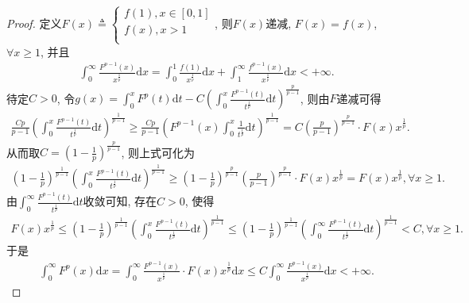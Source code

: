 \documentclass[../../main.tex]{subfiles}%
\begin{document}
\begin{proof}

定义$F\left( x \right) \triangleq \begin{cases}
f\left( 1 \right) ,x\in \left[ 0,1 \right]\\
f\left( x \right) ,x>1\\
\end{cases}$, 则$F\left( x \right) $递减, $F\left( x \right) =f\left( x \right) $, $\forall x\geqslant 1$, 并且
\begin{align*}
\int_0^{\infty}{\frac{F^{p-1}\left( x \right)}{x^{\frac{1}{p}}}\mathrm{d}x}=\int_0^1{\frac{f\left( 1 \right)}{x^{\frac{1}{p}}}\mathrm{d}x}+\int_1^{\infty}{\frac{f^{p-1}\left( x \right)}{x^{\frac{1}{p}}}\mathrm{d}x}<+\infty .
\end{align*}
待定$C>0$, 令$g\left( x \right) =\int_0^x{F^p\left( t \right)}\mathrm{d}t-C\left( \int_0^x{\frac{F^{p-1}\left( t \right)}{t^{\frac{1}{p}}}\mathrm{d}t} \right) ^{\frac{p}{p-1}}$, 则由$F$递减可得
\begin{align*}
\frac{Cp}{p-1}\left( \int_0^x{\frac{F^{p-1}\left( t \right)}{t^{\frac{1}{p}}}\mathrm{d}t} \right) ^{\frac{1}{p-1}}\geqslant \frac{Cp}{p-1}\left( F^{p-1}\left( x \right) \int_0^x{\frac{1}{t^{\frac{1}{p}}}\mathrm{d}t} \right) ^{\frac{1}{p-1}}=C\left( \frac{p}{p-1} \right) ^{\frac{p}{p-1}}\cdot F\left( x \right) x^{\frac{1}{p}}.
\end{align*}
从而取$C=\left( 1-\frac{1}{p} \right) ^{\frac{p}{p-1}}$, 则上式可化为
\begin{align*}
\left( 1-\frac{1}{p} \right) ^{\frac{1}{p-1}}\left( \int_0^x{\frac{F^{p-1}\left( t \right)}{t^{\frac{1}{p}}}\mathrm{d}t} \right) ^{\frac{1}{p-1}}\geqslant \left( 1-\frac{1}{p} \right) ^{\frac{p}{p-1}}\left( \frac{p}{p-1} \right) ^{\frac{p}{p-1}}\cdot F\left( x \right) x^{\frac{1}{p}}=F\left( x \right) x^{\frac{1}{p}},\forall x\geqslant 1.
\end{align*}
由$\int_0^{\infty}{\frac{F^{p-1}\left( t \right)}{t^{\frac{1}{p}}}\mathrm{d}t}$收敛可知, 存在$C>0$, 使得
\begin{align*}
F\left( x \right) x^{\frac{1}{p}}\leqslant \left( 1-\frac{1}{p} \right) ^{\frac{1}{p-1}}\left( \int_0^x{\frac{F^{p-1}\left( t \right)}{t^{\frac{1}{p}}}\mathrm{d}t} \right) ^{\frac{1}{p-1}}\leqslant \left( 1-\frac{1}{p} \right) ^{\frac{1}{p-1}}\left( \int_0^{\infty}{\frac{F^{p-1}\left( t \right)}{t^{\frac{1}{p}}}\mathrm{d}t} \right) ^{\frac{1}{p-1}}<C,\forall x\geqslant 1.
\end{align*}
于是
\begin{align*}
\int_0^{\infty}{F^p\left( x \right)}\mathrm{d}x=\int_0^{\infty}{\frac{F^{p-1}\left( x \right)}{x^{\frac{1}{p}}}\cdot F\left( x \right) x^{\frac{1}{p}}\mathrm{d}x}\leqslant C\int_0^{\infty}{\frac{F^{p-1}\left( x \right)}{x^{\frac{1}{p}}}\mathrm{d}x}<+\infty .
\end{align*}

\end{proof}
\end{document}
